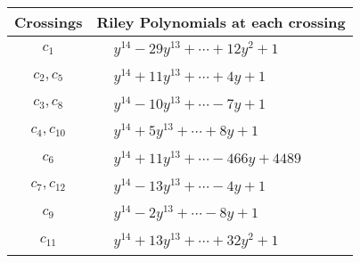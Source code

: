 \documentclass[1p]{elsarticle_modified}
\theoremstyle{definition}
\begin{document}
\begin{tabular}{m{50pt}|m{274pt}}
Crossings & \hspace{64pt}Riley Polynomials at each crossing \\
\hline $$\begin{aligned}c_{1}\end{aligned}$$&$\begin{aligned}
&y^{14}-29 y^{13}+\cdots+12 y^2+1
\end{aligned}$\\
\hline $$\begin{aligned}c_{2},c_{5}\end{aligned}$$&$\begin{aligned}
&y^{14}+11 y^{13}+\cdots+4 y+1
\end{aligned}$\\
\hline $$\begin{aligned}c_{3},c_{8}\end{aligned}$$&$\begin{aligned}
&y^{14}-10 y^{13}+\cdots-7 y+1
\end{aligned}$\\
\hline $$\begin{aligned}c_{4},c_{10}\end{aligned}$$&$\begin{aligned}
&y^{14}+5 y^{13}+\cdots+8 y+1
\end{aligned}$\\
\hline $$\begin{aligned}c_{6}\end{aligned}$$&$\begin{aligned}
&y^{14}+11 y^{13}+\cdots-466 y+4489
\end{aligned}$\\
\hline $$\begin{aligned}c_{7},c_{12}\end{aligned}$$&$\begin{aligned}
&y^{14}-13 y^{13}+\cdots-4 y+1
\end{aligned}$\\
\hline $$\begin{aligned}c_{9}\end{aligned}$$&$\begin{aligned}
&y^{14}-2 y^{13}+\cdots-8 y+1
\end{aligned}$\\
\hline $$\begin{aligned}c_{11}\end{aligned}$$&$\begin{aligned}
&y^{14}+13 y^{13}+\cdots+32 y^2+1
\end{aligned}$\\
\hline
\end{tabular}\\~\\
\end{document}
